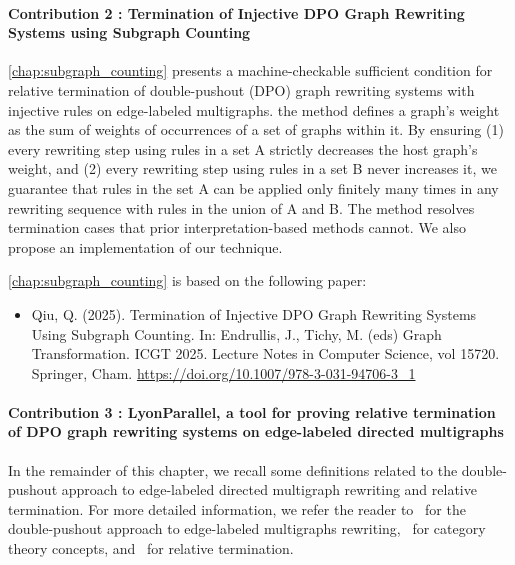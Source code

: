 \paragraph{Contribution 2 : Termination of Injective DPO Graph Rewriting Systems using Subgraph Counting} 

\autoref{chap:subgraph_counting} presents a machine-checkable sufficient condition for relative termination of double-pushout (DPO) graph rewriting systems with injective rules on edge-labeled multigraphs. 
the method defines a graph's weight as the sum of weights of occurrences of a set of graphs within it. By ensuring 
(1) every rewriting step using rules in a set A strictly decreases the host graph's weight, and 
(2) every rewriting step using rules in a set B never increases it, we guarantee that rules in the set A can be applied only finitely many times in any rewriting sequence with rules in the union of A and B.  
The method resolves termination cases that prior interpretation-based methods cannot. 
We also propose an implementation of our technique.

\autoref{chap:subgraph_counting} is based on the following paper:
\begin{itemize}
    \item Qiu, Q. (2025). Termination of Injective DPO Graph Rewriting Systems Using Subgraph Counting. In: Endrullis, J., Tichy, M. (eds) Graph Transformation. ICGT 2025. Lecture Notes in Computer Science, vol 15720. Springer, Cham. \url{https://doi.org/10.1007/978-3-031-94706-3_1}
\end{itemize}

\paragraph{Contribution 3 : LyonParallel, a tool for proving relative termination of DPO graph rewriting systems on edge-labeled directed multigraphs}

In the remainder of this chapter, we recall some definitions related to the double-pushout approach to edge-labeled directed multigraph rewriting and relative termination. For more detailed information, we refer the reader to~\cite{konig2018atutorial,corradini1997algebraic} for the double-pushout approach to edge-labeled multigraphs rewriting,~\cite{pierce1991basic,barr1990category} for category theory concepts, and~\cite{geser1990relative} for relative termination.